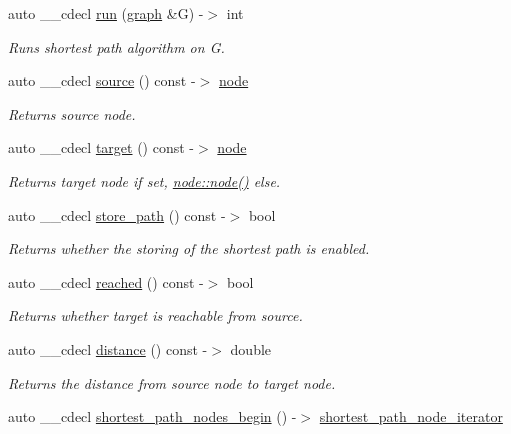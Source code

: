 \begin{DoxyCompactItemize}
auto \+\_\+\+\_\+cdecl \mbox{\hyperlink{classbid__dijkstra_a819e72158a0c594ec5d8bcf07b6a435a}{run}} (\mbox{\hyperlink{classgraph}{graph}} \&G) -\/$>$ int
\begin{DoxyCompactList}\small\item\em Runs shortest path algorithm on {\ttfamily G}. \end{DoxyCompactList}\item 
auto \+\_\+\+\_\+cdecl \mbox{\hyperlink{classbid__dijkstra_a916d7f45a21259fd1f4e2010924cf276}{source}} () const -\/$>$ \mbox{\hyperlink{classnode}{node}}
\begin{DoxyCompactList}\small\item\em Returns source node. \end{DoxyCompactList}\item 
auto \+\_\+\+\_\+cdecl \mbox{\hyperlink{classbid__dijkstra_a3eea86ca2a83dec8aee865f2f4f00f26}{target}} () const -\/$>$ \mbox{\hyperlink{classnode}{node}}
\begin{DoxyCompactList}\small\item\em Returns target node if set, {\ttfamily \mbox{\hyperlink{classnode_ad603259398d5667e3b97a6322a2bcc20}{node\+::node()}}} else. \end{DoxyCompactList}\item 
auto \+\_\+\+\_\+cdecl \mbox{\hyperlink{classbid__dijkstra_abc92453ccade60d676bf2074c7fb0493}{store\+\_\+path}} () const -\/$>$ bool
\begin{DoxyCompactList}\small\item\em Returns whether the storing of the shortest path is enabled. \end{DoxyCompactList}\item 
auto \+\_\+\+\_\+cdecl \mbox{\hyperlink{classbid__dijkstra_aa2be4417ba3f1a78b0697ce2f7268812}{reached}} () const -\/$>$ bool
\begin{DoxyCompactList}\small\item\em Returns whether target is reachable from source. \end{DoxyCompactList}\item 
auto \+\_\+\+\_\+cdecl \mbox{\hyperlink{classbid__dijkstra_ab379dab835a4d06be909f9c91d1e0806}{distance}} () const -\/$>$ double
\begin{DoxyCompactList}\small\item\em Returns the distance from source node to target node. \end{DoxyCompactList}\item 
auto \+\_\+\+\_\+cdecl \mbox{\hyperlink{classbid__dijkstra_a962906e4dab0dc65ed7aa6afe4ec966c}{shortest\+\_\+path\+\_\+nodes\+\_\+begin}} () -\/$>$ \mbox{\hyperlink{classbid__dijkstra_ada2e642d9f0582d30fe1dd51c4aa1899}{shortest\+\_\+path\+\_\+node\+\_\+iterator}}

\end{DoxyCompactItemize}
